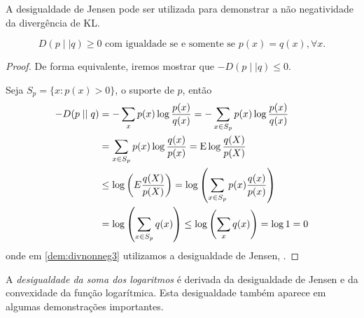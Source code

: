 A desigualdade de Jensen pode ser utilizada para demonstrar a não negatividade
da divergência de KL.
\begin{lemma}
\begin{equation}
D(p \mid\mid q) \geq 0 \text{ com igualdade se e somente se } p(x) = q(x), \forall x.
\end{equation}
\end{lemma}
\begin{proof}
De forma equivalente, iremos mostrar que $-D(p \mid\mid q) \leq 0$.

Seja $S_p=\{x: p(x) > 0\}$, o suporte de $p$, então
\begin{subequations}\label{dem:divnonneg}
\begin{align}
-D(p \mid\mid q) &= -\sum_x p(x) \log \frac{p(x)}{q(x)} = -\sum_{x \in S_p} p(x) \log \frac{p(x)}{q(x)} \label{dem:divnonneg1}\\
         &= \sum_{x \in S_p} p(x) \log \frac{q(x)}{p(x)} = \E \log \frac{q(X)}{p(X)} \label{dem:divnonneg2}\\
	 &\leq \log \left( E \frac{q(X)}{p(X)} \right) = \log \left( \sum_{x \in S_p} p(x) \frac{q(x)}{p(x)} \right) \label{dem:divnonneg3}\\
	 &= \log \left( \sum_{x \in S_p} q(x) \right) \leq \log \left( \sum_x  q(x) \right) = \log 1 = 0 \label{dem:divnonneg4}
\end{align}
\end{subequations}
onde em \ref{dem:divnonneg3} utilizamos a desigualdade de Jensen, .
\end{proof}



A \emph{desigualdade da soma dos logaritmos} é derivada da desigualdade de Jensen e da convexidade da função logarítmica.
Esta desigualdade também aparece em algumas demonstrações importantes.

